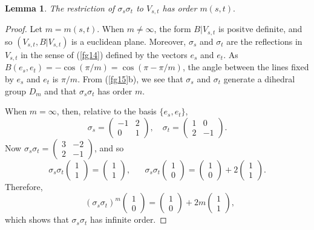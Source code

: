 \documentclass[a4paper,11pt,final]{memoir}%
\newtheorem{lemma}[X]{Lemma}
\theoremstyle{nonumberplain}
\newtheorem{proof}{Proof.}
\begin{document}
\begin{lemma}
\label{fg18}The restriction of $\sigma_{s}\sigma_{t}$ to $V_{s,t}$ has order
$m(s,t).$
\end{lemma}

\begin{proof}
Let $m=m(s,t)$. When $m\neq\infty$, the form $B|V_{s,t}$ is positve definite,
and so $(V_{s,t},B|V_{s,t})$ is a euclidean plane. Moreover, $\sigma_{s}$ and
$\sigma_{t}$ are the reflections in $V_{s,t}$ in the sense of (\ref{fg14})
defined by the vectors $e_{s}$ and $e_{t}$. As $B(e_{s},e_{t})=-\cos
(\pi/m)=\cos(\pi-\pi/m)$, the angle between the lines fixed by $e_{s}$ and
$e_{t}$ is $\pi/m$. From (\ref{fg15}b), we see that $\sigma_{s}$ and
$\sigma_{t}$ generate a dihedral group $D_{m}$ and that $\sigma_{s}\sigma_{t}$
has order $m$.

When $m=\infty$, then, relative to the basis $\{e_{s},e_{t}\}$,
\[
\sigma_{s}=%
\begin{pmatrix}
-1 & 2\\
0 & 1
\end{pmatrix}
,\quad\sigma_{t}=%
\begin{pmatrix}
1 & 0\\
2 & -1
\end{pmatrix}
.
\]
Now $\sigma_{s}\sigma_{t}=%
\begin{pmatrix}
3 & -2\\
2 & -1
\end{pmatrix}
$, and so%
\[
\sigma_{s}\sigma_{t}%
\begin{pmatrix}
1\\
1
\end{pmatrix}
=%
\begin{pmatrix}
1\\
1
\end{pmatrix}
,\quad\text{ }\sigma_{s}\sigma_{t}%
\begin{pmatrix}
1\\
0
\end{pmatrix}
=%
\begin{pmatrix}
1\\
0
\end{pmatrix}
+2%
\begin{pmatrix}
1\\
1
\end{pmatrix}
\text{.}%
\]
Therefore,%
\[
\text{ }\left(  \sigma_{s}\sigma_{t}\right)  ^{m}%
\begin{pmatrix}
1\\
0
\end{pmatrix}
=%
\begin{pmatrix}
1\\
0
\end{pmatrix}
+2m%
\begin{pmatrix}
1\\
1
\end{pmatrix}
,
\]
which shows that $\sigma_{s}\sigma_{t}$ has infinite order.
\end{proof}
\end{document}
